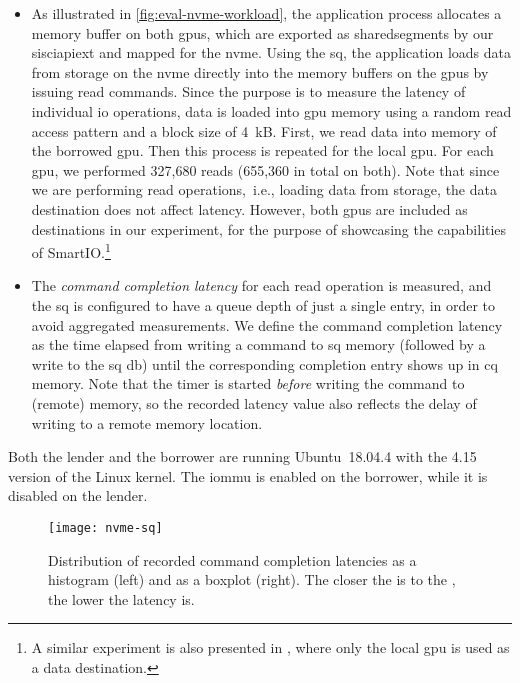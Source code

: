 \begin{itemize}
    \item 
        As illustrated in \cref{fig:eval-nvme-workload}, the application process allocates a memory buffer on both \glspl{gpu}, which are exported as \glspl{sharedsegment} by our \gls{sisciapiext} and mapped for the \gls{nvme}.
        Using the \gls{sq}, the application loads data from storage on the \gls{nvme} directly into the memory buffers on the \glspl{gpu} by issuing read commands.
        Since the purpose is to measure the latency of individual \gls{io} operations, data is loaded into \gls{gpu} memory using a random read access pattern and a block size of 4~kB.
        First, we read data into memory of the borrowed \gls{gpu}.
        Then this process is repeated for the local \gls{gpu}.
        For each \gls{gpu}, we performed 327,680 reads (655,360 in total on both).
        Note that since we are performing read operations,~i.e., loading data from storage, the data destination does not affect latency.
        However, both \glspl{gpu} are included as destinations in our experiment, for the purpose of showcasing the capabilities of SmartIO.\footnote{A similar experiment is also presented in , where only the local \gls{gpu} is used as a data destination.}

    \item 
        The \emph{command completion latency} for each read operation is measured, and the \gls{sq} is configured to have a queue depth of just a single entry, in order to avoid aggregated measurements.
        We define the command completion latency as the time elapsed from writing a command to \gls{sq} memory (followed by a write to the \gls{sq} \gls{db}) until the corresponding completion entry shows up in \gls{cq} memory.
        Note that the timer is started \emph{before} writing the command to (remote) memory, so the recorded latency value also reflects the delay of writing to a remote memory location.
\end{itemize}
%
Both the \gls{lender} and the \gls{borrower} are running Ubuntu~18.04.4 with the 4.15 version of the Linux kernel.
%
The \gls{iommu} is enabled on the \gls{borrower}, while it is disabled on the \gls{lender}.


\begin{figure}[!h]
    \centering
    \texttt{[image: nvme-sq]}
    \caption{Distribution of recorded command completion latencies as a histogram (left) and as a boxplot (right). The closer the  is to the , the lower the latency is.}
    \label{fig:eval-nvme-results}
\end{figure}




